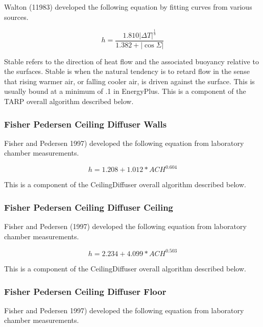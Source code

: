 Walton (11983) developed the following equation by fitting curves from various sources.

\begin{equation}
h = \frac{{1.810{{\left| {\Delta T} \right|}^{\frac{1}{3}}}}}{{1.382 + \left| {\cos \Sigma } \right|}}
\end{equation}

Stable refers to the direction of heat flow and the associated buoyancy relative to the surfaces. Stable is when the natural tendency is to retard flow in the sense that rising warmer air, or falling cooler air, is driven against the surface. This is usually bound at a minimum of .1 in EnergyPlus. This is a component of the TARP overall algorithm described below.

\subsubsection{Fisher Pedersen Ceiling Diffuser Walls}\label{fisher-pedersen-ceiling-diffuser-walls}

Fisher and Pedersen 1997) developed the following equation from laboratory chamber measurements.

\begin{equation}
h = 1.208 + 1.012 * AC{H^{0.604}}
\end{equation}

This is a component of the CeilingDiffuser overall algorithm described below.

\subsubsection{Fisher Pedersen Ceiling Diffuser Ceiling}\label{fisher-pedersen-ceiling-diffuser-ceiling}

Fisher and Pedersen (1997) developed the following equation from laboratory chamber measurements.

\begin{equation}
h = 2.234 + 4.099 * AC{H^{0.503}}
\end{equation}

This is a component of the CeilingDiffuser overall algorithm described below.

\subsubsection{Fisher Pedersen Ceiling Diffuser Floor}\label{fisher-pedersen-ceiling-diffuser-floor}

Fisher and Pedersen 1997) developed the following equation from laboratory chamber measurements.

